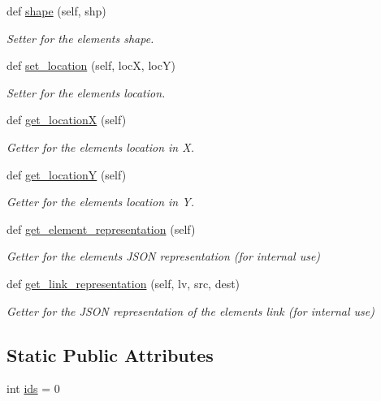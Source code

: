 \begin{DoxyCompactItemize}
$$def \mbox{\hyperlink{classbridges_1_1element_1_1_element_a54d45aa4c09c0b5745cebbabcc0c02f9}{shape}} (self, shp)
\begin{DoxyCompactList}\small\item\em Setter for the element\textquotesingle{}s shape. \end{DoxyCompactList}\item 
def \mbox{\hyperlink{classbridges_1_1element_1_1_element_aa1387621f7afa6b6f6acd052a1126320}{set\+\_\+location}} (self, locX, locY)
\begin{DoxyCompactList}\small\item\em Setter for the element\textquotesingle{}s location. \end{DoxyCompactList}\item 
def \mbox{\hyperlink{classbridges_1_1element_1_1_element_aa921953dab3cec5253e813bb1709895a}{get\+\_\+locationX}} (self)
\begin{DoxyCompactList}\small\item\em Getter for the element\textquotesingle{}s location in X. \end{DoxyCompactList}\item 
def \mbox{\hyperlink{classbridges_1_1element_1_1_element_a108f62843d084beaf5fcf5fd202853c5}{get\+\_\+locationY}} (self)
\begin{DoxyCompactList}\small\item\em Getter for the element\textquotesingle{}s location in Y. \end{DoxyCompactList}\item 
def \mbox{\hyperlink{classbridges_1_1element_1_1_element_a511fbc6323616d806ae0ae33010f4654}{get\+\_\+element\+\_\+representation}} (self)
\begin{DoxyCompactList}\small\item\em Getter for the element\textquotesingle{}s J\+S\+ON representation (for internal use) \end{DoxyCompactList}\item 
def \mbox{\hyperlink{classbridges_1_1element_1_1_element_a8f220d7b81c0e0dd84b9eff33ade76b9}{get\+\_\+link\+\_\+representation}} (self, lv, src, dest)
\begin{DoxyCompactList}\small\item\em Getter for the J\+S\+ON representation of the element\textquotesingle{}s link (for internal use) \end{DoxyCompactList}\end{DoxyCompactItemize}
\subsection*{Static Public Attributes}
\begin{DoxyCompactItemize}
\item 
int \mbox{\hyperlink{classbridges_1_1element_1_1_element_a61f02c915a65554b76dd6534e5a4d834}{ids}} = 0
\end{DoxyCompactItemize}


